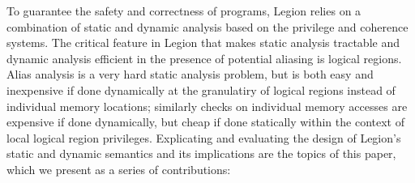 To guarantee the safety and correctness of programs, Legion relies on
a combination of static and dynamic analysis based on the privilege
and coherence systems.  
The critical feature in Legion that makes static analysis tractable
and dynamic analysis efficient in the presence of potential aliasing is logical regions.
Alias analysis is a very hard static analysis problem, but is both easy and
inexpensive if done dynamically at the granulatiry of logical regions instead
of individual memory locations; similarly
checks on individual memory accesses are expensive if done dynamically, but
cheap if done statically within the context of local logical region privileges.
Explicating and evaluating the design of Legion's
static and dynamic semantics and its implications are the topics of this paper,
which we present as a series of contributions:

